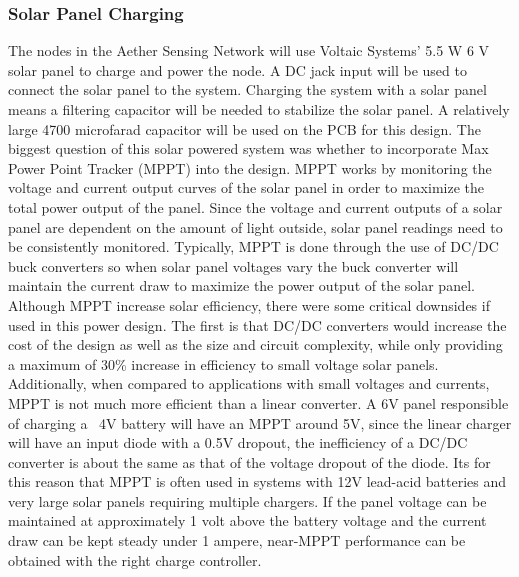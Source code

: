 \subsubsection{Solar Panel Charging}
The nodes in the Aether Sensing Network will use Voltaic Systems’ 5.5 W 6 V solar panel to charge and power the node. A DC jack input will be used to connect the solar panel to the system. Charging the system with a solar panel means a filtering capacitor will be needed to stabilize the solar panel. A relatively large 4700 microfarad capacitor will be used on the PCB for this design. The biggest question of this solar powered system was whether to incorporate Max Power Point Tracker (MPPT) into the design. MPPT works by monitoring the voltage and current output curves of the solar panel in order to maximize the total power output of the panel. Since the voltage and current outputs of a solar panel are dependent on the amount of light outside, solar panel readings need to be consistently monitored. Typically, MPPT is done through the use of DC/DC buck converters so when solar panel voltages vary the buck converter will maintain the current draw to maximize the power output of the solar panel. Although MPPT increase solar efficiency, there were some critical downsides if used in this power design. The first is that DC/DC converters would increase the cost of the design as well as the size and circuit complexity, while only providing a maximum of 30\% increase in efficiency to small voltage solar panels. Additionally, when compared to applications with small voltages and currents, MPPT is not much more efficient than a linear converter. A 6V panel responsible of charging a ~4V battery will have an MPPT around 5V, since the linear charger will have an input diode with a 0.5V dropout, the inefficiency of a DC/DC converter is about the same as that of the voltage dropout of the diode. Its for this reason that MPPT is often used in systems with 12V lead-acid batteries and very large solar panels requiring multiple chargers. If the panel voltage can be maintained at approximately 1 volt above the battery voltage and the current draw can be kept steady under 1 ampere, near-MPPT performance can be obtained with the right charge controller.


